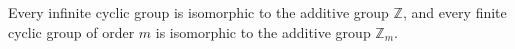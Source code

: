 Every infinite cyclic group is isomorphic to the additive group $\mathbb{Z}$, and every finite cyclic group of order $m$ is isomorphic to the additive group $\mathbb{Z}_m$.
